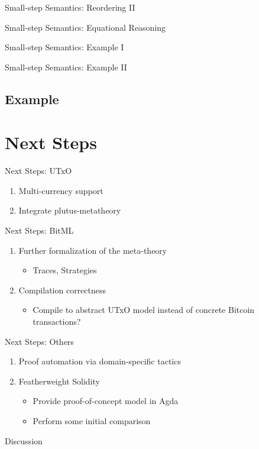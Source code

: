 \documentclass{beamer}
\renewcommand\alert[1]{\textcolor{mLightBrown}{#1}}
\begin{document}
\begin{frame}{Small-step Semantics: Reordering II}
\BITgeneralRule{}
\end{frame}

\begin{frame}{Small-step Semantics: Equational Reasoning}
\BITeqReasoning{}
\end{frame}

\begin{frame}{Small-step Semantics: Example I}
\BITexampleA{}
\end{frame}

\begin{frame}{Small-step Semantics: Example II}
\BITexampleB{}
\end{frame}

\subsection{Example}

\section{Next Steps}

\begin{frame}{Next Steps: UTxO}
\begin{enumerate}
\item Multi-currency support
\item Integrate \alert{plutus-metatheory}
\end{enumerate}
\end{frame}

\begin{frame}{Next Steps: BitML}
\begin{enumerate}
\item Further formalization of the meta-theory
  \begin{itemize}
  \item Traces, Strategies
  \end{itemize}
\item Compilation correctness
  \begin{itemize}
  \item Compile to abstract UTxO model instead of concrete Bitcoin transactions?
  \end{itemize}
\end{enumerate}
\end{frame}

\begin{frame}{Next Steps: Others}
\begin{enumerate}
\item Proof automation via domain-specific tactics
\item Featherweight Solidity
  \begin{itemize}
  \item Provide proof-of-concept model in Agda
  \item Perform some initial comparison
  \end{itemize}
\end{enumerate}
\end{frame}

\begin{frame}[standout]
  Discussion
\end{frame}
  
\end{document}
